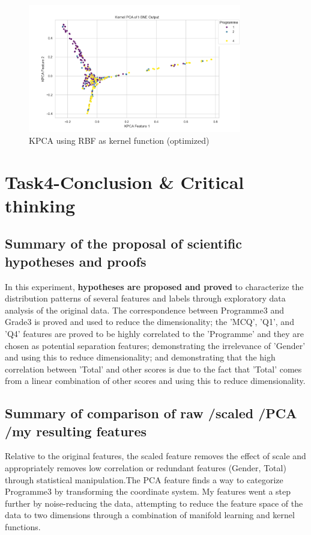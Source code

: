 \documentclass[journal]{IEEEtai}
\begin{document}
\begin{figure}[htbp]
	\centerline{\includegraphics[width=22pc]{kpca_after_tnse2d_rbf_mod.png}}
	\caption{KPCA using RBF as kernel function (optimized)}
\end{figure}


\section{\textbf{Task4-Conclusion \& Critical thinking}}
\subsection{Summary of the proposal of scientific hypotheses and proofs}
In this experiment, \textbf{hypotheses are proposed and proved} to characterize the distribution patterns of several features and labels through exploratory data analysis of the original data. The correspondence between Programme3 and Grade3 is proved and used to reduce the dimensionality; the 'MCQ', 'Q1', and 'Q4' features are proved to be highly correlated to the 'Programme' and they are chosen as potential separation features; demonstrating the irrelevance of 'Gender' and using this to reduce dimensionality; and demonstrating that the high correlation between 'Total' and other scores is due to the fact that 'Total' comes from a linear combination of other scores and using this to reduce dimensionality.

\subsection{Summary of comparison of raw /scaled /PCA /my resulting features}
Relative to the original features, the scaled feature removes the effect of scale and appropriately removes low correlation or redundant features (Gender, Total) through statistical manipulation.The PCA feature finds a way to categorize Programme3 by transforming the coordinate system. My features went a step further by noise-reducing the data, attempting to reduce the feature space of the data to two dimensions through a combination of manifold learning and kernel functions.
\end{document}

